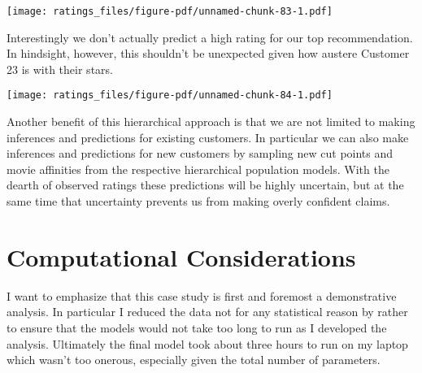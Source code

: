 \documentclass[
  letterpaper,
  DIV=11,
  numbers=noendperiod]{scrartcl}
\newenvironment{Shaded}{\begin{snugshade}}{\end{snugshade}}
\newcommand{\AttributeTok}[1]{\textcolor[rgb]{0.40,0.45,0.13}{#1}}
\newcommand{\DecValTok}[1]{\textcolor[rgb]{0.68,0.00,0.00}{#1}}
\newcommand{\FloatTok}[1]{\textcolor[rgb]{0.68,0.00,0.00}{#1}}
\newcommand{\FunctionTok}[1]{\textcolor[rgb]{0.28,0.35,0.67}{#1}}
\newcommand{\NormalTok}[1]{\textcolor[rgb]{0.00,0.23,0.31}{#1}}
\newcommand{\SpecialCharTok}[1]{\textcolor[rgb]{0.37,0.37,0.37}{#1}}
\newcommand{\StringTok}[1]{\textcolor[rgb]{0.13,0.47,0.30}{#1}}
\begin{document}
\texttt{[image: ratings\_files/figure-pdf/unnamed-chunk-83-1.pdf]}

Interestingly we don't actually predict a high rating for our top
recommendation. In hindsight, however, this shouldn't be unexpected
given how austere Customer 23 is with their stars.

\begin{Shaded}
\end{Shaded}

\texttt{[image: ratings\_files/figure-pdf/unnamed-chunk-84-1.pdf]}

Another benefit of this hierarchical approach is that we are not limited
to making inferences and predictions for existing customers. In
particular we can also make inferences and predictions for new customers
by sampling new cut points and movie affinities from the respective
hierarchical population models. With the dearth of observed ratings
these predictions will be highly uncertain, but at the same time that
uncertainty prevents us from making overly confident claims.

\section{Computational
Considerations}\label{computational-considerations}

I want to emphasize that this case study is first and foremost a
demonstrative analysis. In particular I reduced the data not for any
statistical reason by rather to ensure that the models would not take
too long to run as I developed the analysis. Ultimately the final model
took about three hours to run on my laptop which wasn't too onerous,
especially given the total number of parameters.
\end{document}
